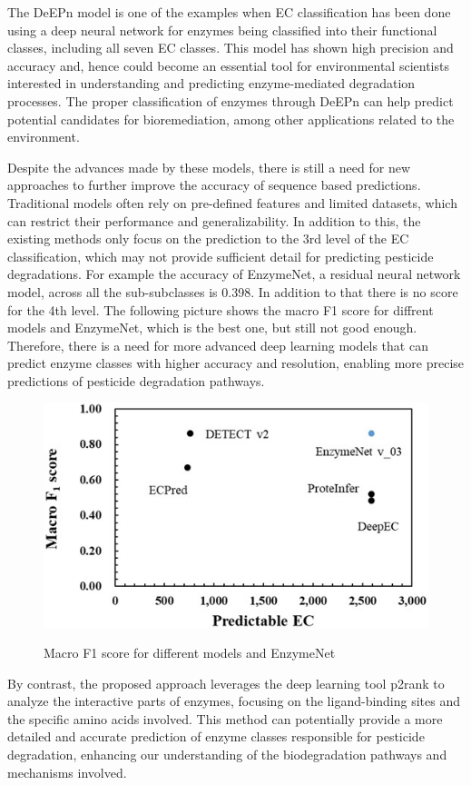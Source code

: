 The DeEPn model is one of the examples when EC classification has been done using a deep neural network for enzymes being classified into their functional classes, including all seven EC classes. This model has shown high precision and accuracy and, hence could become an essential tool for environmental scientists interested in understanding and predicting enzyme-mediated degradation processes. The proper classification of enzymes through DeEPn can help predict potential candidates for bioremediation, among other applications related to the environment. \autocite{DeEPnDeepNeural}

Despite the advances made by these models, there is still a need for new approaches to further improve the accuracy of sequence based predictions. Traditional models often rely on pre-defined features and limited datasets, which can restrict their performance and generalizability. In addition to this, the existing methods only focus on the prediction to the 3rd level of the EC classification, which may not provide sufficient detail for predicting pesticide degradations. For example the accuracy of EnzymeNet, a residual neural network model, across all the sub-subclasses is 0.398. In addition to that there is no score for the 4th level. The following picture shows the macro F1 score for diffrent models and EnzymeNet, which is the best one, but still not good enough. Therefore, there is a need for more advanced deep learning models that can predict enzyme classes with higher accuracy and resolution, enabling more precise predictions of pesticide degradation pathways. \autocite{watanabeEnzymeNetResidualNeural2023}
\begin{figure}[hbt]
    \centering
    \begin{minipage}[t]{.8\textwidth}
    \caption{Macro F1 score for different models and EnzymeNet}
    \includegraphics[width=1\textwidth]{img/performance_existing_methods.png}
    \label{fig:EnzymeNet}
    \end{minipage}
\end{figure}

By contrast, the proposed approach leverages the deep learning tool p2rank to analyze the interactive parts of enzymes, focusing on the ligand-binding sites and the specific amino acids involved.  This method can potentially provide a more detailed and accurate prediction of enzyme classes responsible for pesticide degradation, enhancing our understanding of the biodegradation pathways and mechanisms involved. \autocite{krivakP2RankMachineLearning2018}